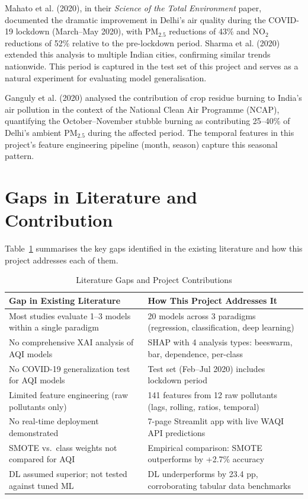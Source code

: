 \documentclass[12pt,a4paper]{report}
\begin{document}
Mahato et al. (2020), in their \textit{Science of the Total Environment} paper, documented the dramatic improvement in Delhi's air quality during the COVID-19 lockdown (March--May 2020), with PM$_{2.5}$ reductions of 43\% and NO$_2$ reductions of 52\% relative to the pre-lockdown period. Sharma et al. (2020) extended this analysis to multiple Indian cities, confirming similar trends nationwide. This period is captured in the test set of this project and serves as a natural experiment for evaluating model generalisation.

Ganguly et al. (2020) analysed the contribution of crop residue burning to India's air pollution in the context of the National Clean Air Programme (NCAP), quantifying the October--November stubble burning as contributing 25--40\% of Delhi's ambient PM$_{2.5}$ during the affected period. The temporal features in this project's feature engineering pipeline (month, season) capture this seasonal pattern.

\section{Gaps in Literature and Contribution}

Table~\ref{tab:gaps} summarises the key gaps identified in the existing literature and how this project addresses each of them.

\begin{table}[H]
\centering
\caption{Literature Gaps and Project Contributions}
\label{tab:gaps}
\small
\begin{tabular}{|p{5.5cm}|p{7.5cm}|}
\hline
\textbf{Gap in Existing Literature} & \textbf{How This Project Addresses It} \\
\hline
Most studies evaluate 1--3 models within a single paradigm & 20 models across 3 paradigms (regression, classification, deep learning) \\
\hline
No comprehensive XAI analysis of AQI models & SHAP with 4 analysis types: beeswarm, bar, dependence, per-class \\
\hline
No COVID-19 generalization test for AQI models & Test set (Feb--Jul 2020) includes lockdown period \\
\hline
Limited feature engineering (raw pollutants only) & 141 features from 12 raw pollutants (lags, rolling, ratios, temporal) \\
\hline
No real-time deployment demonstrated & 7-page Streamlit app with live WAQI API predictions \\
\hline
SMOTE vs.\ class weights not compared for AQI & Empirical comparison: SMOTE outperforms by +2.7\% accuracy \\
\hline
DL assumed superior; not tested against tuned ML & DL underperforms by 23.4 pp, corroborating tabular data benchmarks \\
\hline
\end{tabular}
\end{table}
\end{document}
